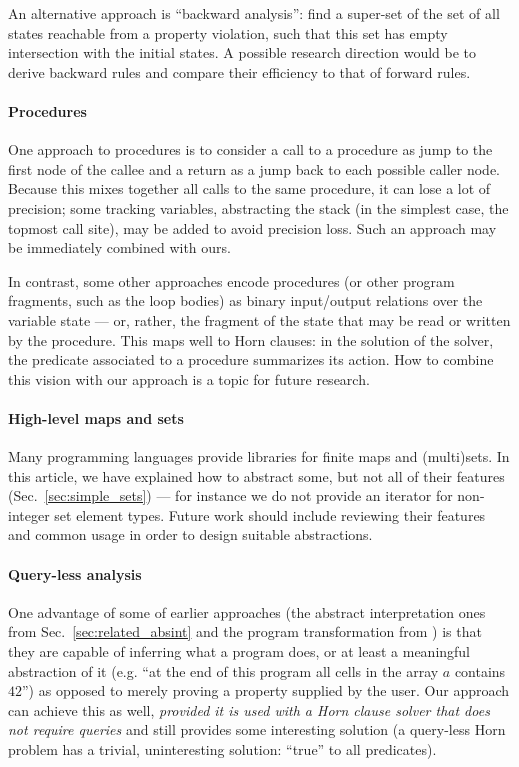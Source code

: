 \documentclass[a4paper]{article}
\theoremstyle{definition}
\theoremstyle{plain}
\begin{document}
An alternative approach is ``backward analysis'': find a super-set of the set of all states reachable from a property violation, such that this set has empty intersection with the initial states.
A possible research direction would be to derive backward rules and compare their efficiency to that of forward rules.

\paragraph{Procedures}
One approach to procedures is to consider a call to a procedure as jump to the first node of the callee and a return as a jump back to each possible caller node.
Because this mixes together all calls to the same procedure, it can lose a lot of precision; some tracking variables, abstracting the stack (in the simplest case, the topmost call site), may be added to avoid precision loss.
Such an approach may be immediately combined with ours.

In contrast, some other approaches encode procedures (or other program fragments, such as the loop bodies) as binary input/output relations over the variable state --- or, rather, the fragment of the state that may be read or written by the procedure. This maps well to Horn clauses: in the solution of the solver, the predicate associated to a procedure summarizes its action.
How to combine this vision with our approach is a topic for future research.

\paragraph{High-level maps and sets}
Many programming languages provide libraries for finite maps and (multi)sets. In this article, we have explained how to abstract some, but not all of their features (Sec.~\ref{sec:simple_sets}) --- for instance we do not provide an iterator for non-integer set element types.
Future work should include reviewing their features and common usage in order to design suitable abstractions.

\paragraph{Query-less analysis} One advantage of some of earlier approaches (the abstract interpretation ones from Sec.~\ref{sec:related_absint} and the program transformation from \citet{Monniaux_Alberti_SAS2015}) is that they are capable of inferring what a program does, or at least a meaningful abstraction of it (e.g. ``at the end of this program all cells in the array $a$ contains $42$'')  as opposed to merely proving a property supplied by the user.
Our approach can achieve this as well, \emph{provided it is used with a Horn clause solver that does not require queries} and still provides some interesting solution (a query-less Horn problem has a trivial, uninteresting solution: ``true'' to all predicates).
\end{document}
